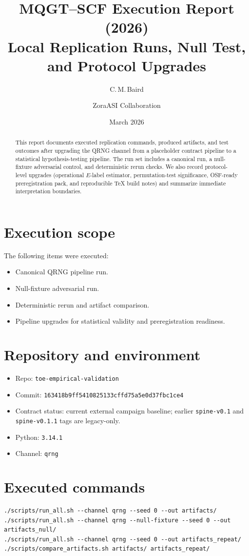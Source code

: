 \documentclass[11pt]{article}
\title{\textbf{MQGT--SCF Execution Report (2026)}\\
Local Replication Runs, Null Test, and Protocol Upgrades}
\author{C.\,M.\,Baird \and ZoraASI Collaboration}
\date{March 2026}
\begin{document}
\maketitle

\begin{abstract}
This report documents executed replication commands, produced artifacts, and test outcomes after upgrading the QRNG channel from a placeholder contract pipeline to a statistical hypothesis-testing pipeline. The run set includes a canonical run, a null-fixture adversarial control, and deterministic rerun checks. We also record protocol-level upgrades (operational $E$-label estimator, permutation-test significance, OSF-ready preregistration pack, and reproducible TeX build notes) and summarize immediate interpretation boundaries.
\end{abstract}

\section{Execution scope}
The following items were executed:
\begin{itemize}
\item Canonical QRNG pipeline run.
\item Null-fixture adversarial run.
\item Deterministic rerun and artifact comparison.
\item Pipeline upgrades for statistical validity and preregistration readiness.
\end{itemize}

\section{Repository and environment}
\begin{itemize}
\item Repo: \texttt{toe-empirical-validation}
\item Commit: \texttt{163418b9ff5410825133cffd75a5e0d37fbc1ce4}
\item Contract status: current external campaign baseline; earlier \texttt{spine-v0.1} and \texttt{spine-v0.1.1} tags are legacy-only.
\item Python: \texttt{3.14.1}
\item Channel: \texttt{qrng}
\end{itemize}

\section{Executed commands}
\begin{verbatim}
./scripts/run_all.sh --channel qrng --seed 0 --out artifacts/
./scripts/run_all.sh --channel qrng --null-fixture --seed 0 --out artifacts_null/
./scripts/run_all.sh --channel qrng --seed 0 --out artifacts_repeat/
./scripts/compare_artifacts.sh artifacts/ artifacts_repeat/
\end{verbatim}
\end{document}
